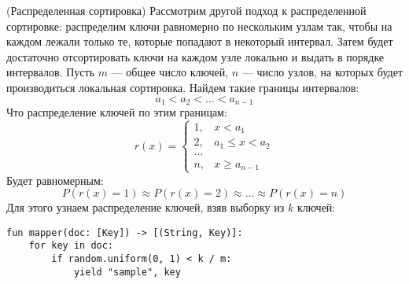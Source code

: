 \begin{algorithm}(Распределенная сортировка)
  \newline
  Рассмотрим другой подход к распределенной сортировке: распределим ключи
  равномерно по нескольким узлам так, чтобы на каждом лежали только те, которые
  попадают в некоторый интервал. Затем будет достаточно отсортировать ключи на
  каждом узле локально и выдать в порядке интервалов.
  \newline
  \newline
  Пусть $m$ --- общее число ключей, $n$ --- число узлов, на которых будет
  производиться локальная сортировка. Найдем такие границы интервалов:
  $$a_1 < a_2 < \ldots < a_{n - 1}$$
  Что распределение ключей по этим границам:
  $$r(x) =
    \begin{cases}
      1, & x < a_1 \\
      2, & a_1 \leq x < a_2 \\
      \ldots \\
      n, & x \geq a_{n - 1}
    \end{cases}$$
  Будет равномерным:
  $$P(r(x) = 1) \approx P(r(x) = 2) \approx \ldots \approx P(r(x) = n)$$
  Для этого узнаем распределение ключей, взяв выборку из $k$ ключей:
  \begin{lstlisting}
fun mapper(doc: [Key]) -> [(String, Key)]:
    for key in doc:
        if random.uniform(0, 1) < k / m:
            yield "sample", key
  \end{lstlisting}
\end{algorithm}
